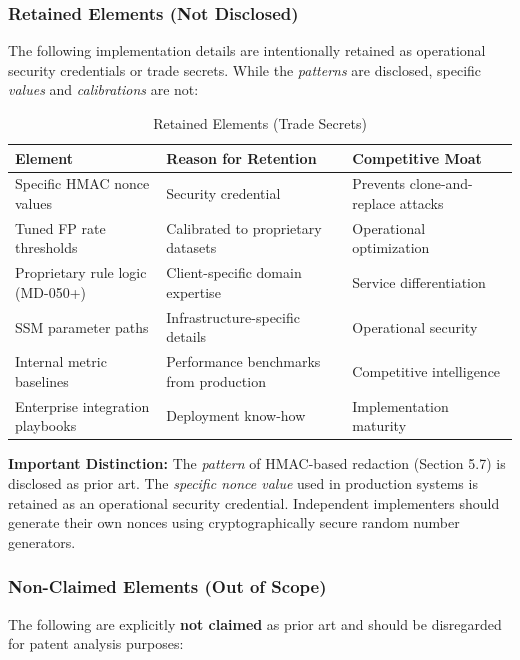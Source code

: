 \documentclass[11pt,a4paper]{article}
\begin{document}
\subsubsection{Retained Elements (Not Disclosed)}

The following implementation details are intentionally retained as operational security credentials or trade secrets. While the \textit{patterns} are disclosed, specific \textit{values} and \textit{calibrations} are not:

\begin{table}[h]
\centering
\small
\begin{tabular}{|p{4cm}|p{5cm}|p{3cm}|}
\hline
\textbf{Element} & \textbf{Reason for Retention} & \textbf{Competitive Moat} \\ \hline
Specific HMAC nonce values & Security credential & Prevents clone-and-replace attacks \\ \hline
Tuned FP rate thresholds & Calibrated to proprietary datasets & Operational optimization \\ \hline
Proprietary rule logic (MD-050+) & Client-specific domain expertise & Service differentiation \\ \hline
SSM parameter paths & Infrastructure-specific details & Operational security \\ \hline
Internal metric baselines & Performance benchmarks from production & Competitive intelligence \\ \hline
Enterprise integration playbooks & Deployment know-how & Implementation maturity \\ \hline
\end{tabular}
\caption{Retained Elements (Trade Secrets)}
\label{tab:retained_elements}
\end{table}

\textbf{Important Distinction:} The \textit{pattern} of HMAC-based redaction (Section 5.7) is disclosed as prior art. The \textit{specific nonce value} used in production systems is retained as an operational security credential. Independent implementers should generate their own nonces using cryptographically secure random number generators.

\subsubsection{Non-Claimed Elements (Out of Scope)}

The following are explicitly \textbf{not claimed} as prior art and should be disregarded for patent analysis purposes:
\end{document}

